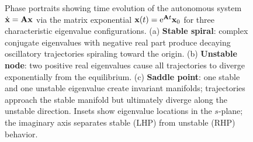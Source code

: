 \begin{figure}[htbp]
\caption{Phase portraits showing time evolution of the autonomous system $\dot{\mathbf{x}} = \mathbf{A}\mathbf{x}$ via the matrix exponential $\mathbf{x}(t) = \mathrm{e}^{\mathbf{A} t}\mathbf{x}_0$ for three characteristic eigenvalue configurations. (a) \textbf{Stable spiral}: complex conjugate eigenvalues with negative real part produce decaying oscillatory trajectories spiraling toward the origin. (b) \textbf{Unstable node}: two positive real eigenvalues cause all trajectories to diverge exponentially from the equilibrium. (c) \textbf{Saddle point}: one stable and one unstable eigenvalue create invariant manifolds; trajectories approach the stable manifold but ultimately diverge along the unstable direction. Insets show eigenvalue locations in the $s$-plane; the imaginary axis separates stable (LHP) from unstable (RHP) behavior.}
\label{fig:matrix_exponential}
\end{figure}
